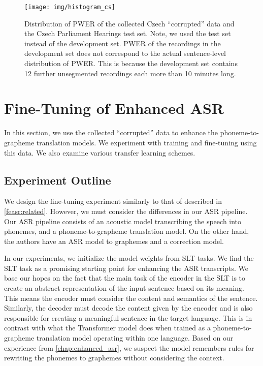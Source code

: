\begin{figure}[t]
	\texttt{[image: img/histogram\_cs]}
	\caption{Distribution of PWER of the collected Czech ``corrupted'' data and the Czech Parliament Hearings test set. Note, we used the test set instead of the development set. PWER of the recordings in the development set does not correspond to the actual sentence-level distribution of PWER. This is because the development set contains 12  further unsegmented recordings each more than 10 minutes long.}
	\label{fig:histogram_cs}
\end{figure}






\section{Fine-Tuning of Enhanced ASR}
\label{feasr:feasr}
In this section, we use the collected ``corrupted'' data to enhance the phoneme-to-grapheme translation models. We experiment with training and fine-tuning using this data. We also examine various transfer learning schemes.

\subsection{Experiment Outline}
We design the fine-tuning experiment similarly to that of  described in \cref{feasr:related}. However, we must consider the differences in our ASR pipeline. Our ASR pipeline consists of an acoustic model transcribing the speech into phonemes, and a phoneme-to-grapheme translation model. On the other hand, the authors have an ASR model to graphemes and a correction model.

In our experiments, we initialize the model weights from SLT tasks. We find the SLT task as a promising starting point for enhancing the ASR transcripts. We base our hopes on the fact that the main task of the encoder in the SLT is to create an abstract representation of the input sentence based on its meaning. This means the encoder must consider the content and semantics of the sentence. Similarly, the decoder must decode the content given by the encoder and is also responsible for creating a meaningful sentence in the target language. This is in contrast with what the Transformer model does when trained as a phoneme-to-grapheme translation model operating within one language. Based on our experience from \cref{chap:enhanced_asr}, we suspect the model remembers rules for rewriting the phonemes to graphemes without considering the context. 

